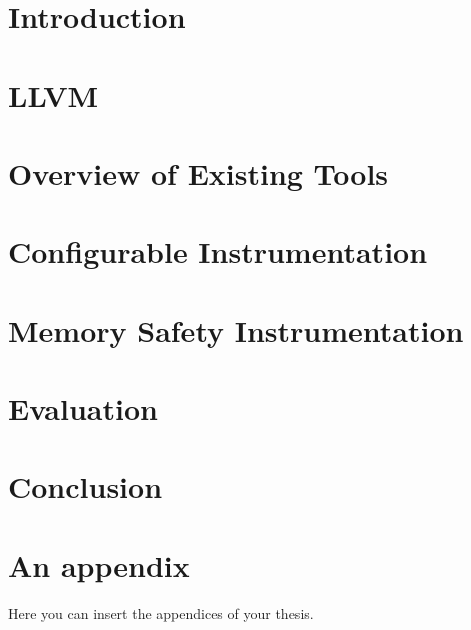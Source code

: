 \documentclass[
  digital, %
  table,   %
  lof,     %
  lot,     %
  nocover
]{fithesis3}
\begin{document}
\chapter{Introduction}


\chapter{LLVM}\label{chap:llvm}


\chapter{Overview of Existing Tools}\label{chap:tools}


\chapter{Configurable Instrumentation}\label{chap:instr}


\chapter{Memory Safety Instrumentation}\label{chap:memsafety}


\chapter{Evaluation}\label{chap:eval}


\chapter{Conclusion}\label{chap:conclusion}


\printbibliography

\appendix %
\chapter{An appendix}
Here you can insert the appendices of your thesis.
\end{document}
